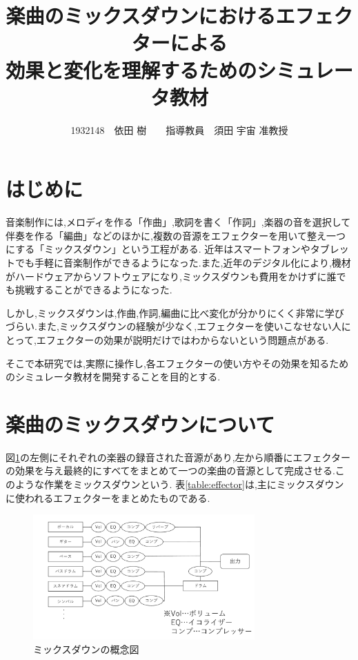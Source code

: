 \documentclass[twocolumn,10pt,a4j]{ltjsarticle}
\title{楽曲のミックスダウンにおけるエフェクターによる\\効果と変化を理解するためのシミュレータ教材}
\author{1932148　依田 樹　　指導教員　須田 宇宙 准教授}
\date{}
\begin{document}
\maketitle

\section{はじめに}
音楽制作には,メロディを作る「作曲」,歌詞を書く「作詞」,楽器の音を選択して伴奏を作る「編曲」などのほかに,複数の音源をエフェクターを用いて整え一つにする「ミックスダウン」という工程がある\cite{mix}.
近年はスマートフォンやタブレットでも手軽に音楽制作ができるようになった.また,近年のデジタル化により,機材がハードウェアからソフトウェアになり,ミックスダウンも費用をかけずに誰でも挑戦することができるようになった\cite{digital}.

しかし,ミックスダウンは,作曲,作詞,編曲に比べ変化が分かりにくく非常に学びづらい.また,ミックスダウンの経験が少なく,エフェクターを使いこなせない人にとって,エフェクターの効果が説明だけではわからないという問題点がある.

そこで本研究では,実際に操作し,各エフェクターの使い方やその効果を知るためのシミュレータ教材を開発することを目的とする.

\section{楽曲のミックスダウンについて}
図\ref{fig:gainen}の左側にそれぞれの楽器の録音された音源があり,左から順番にエフェクターの効果を与え最終的にすべてをまとめて一つの楽曲の音源として完成させる.このような作業をミックスダウンという.
表\ref{table:effector}は,主にミックスダウンに使われるエフェクターをまとめたものである.

\begin{figure}[h]
\centering
 \includegraphics[width=85mm]{./figures/gainen.pdf}
 \caption{ミックスダウンの概念図}
 \label{fig:gainen}
\end{figure}
\end{document}
